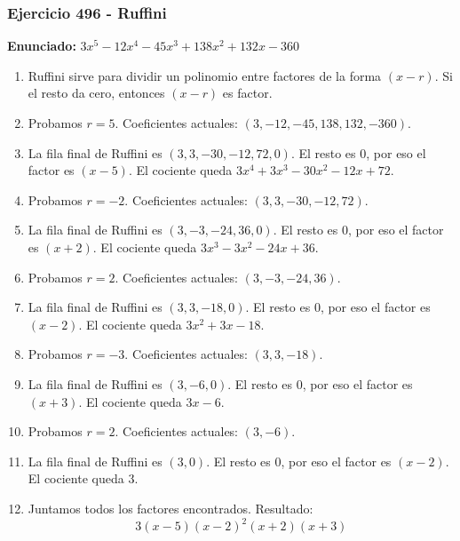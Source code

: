 \documentclass[11pt,a4paper]{article}
\begin{document}
\subsubsection*{Ejercicio 496 - Ruffini}
\textbf{Enunciado:} $ 3 x^{5} - 12 x^{4} - 45 x^{3} + 138 x^{2} + 132 x - 360 $\par
\begin{enumerate}[leftmargin=2em]
\item Ruffini sirve para dividir un polinomio entre factores de la forma \((x-r)\). Si el resto da cero, entonces \((x-r)\) es factor.
\item Probamos \(r=5\). Coeficientes actuales: \((3, -12, -45, 138, 132, -360)\).
\item La fila final de Ruffini es \((3, 3, -30, -12, 72, 0)\). El resto es \(0\), por eso el factor es \((x-5)\). El cociente queda \(3 x^{4} + 3 x^{3} - 30 x^{2} - 12 x + 72\).
\item Probamos \(r=-2\). Coeficientes actuales: \((3, 3, -30, -12, 72)\).
\item La fila final de Ruffini es \((3, -3, -24, 36, 0)\). El resto es \(0\), por eso el factor es \((x+2)\). El cociente queda \(3 x^{3} - 3 x^{2} - 24 x + 36\).
\item Probamos \(r=2\). Coeficientes actuales: \((3, -3, -24, 36)\).
\item La fila final de Ruffini es \((3, 3, -18, 0)\). El resto es \(0\), por eso el factor es \((x-2)\). El cociente queda \(3 x^{2} + 3 x - 18\).
\item Probamos \(r=-3\). Coeficientes actuales: \((3, 3, -18)\).
\item La fila final de Ruffini es \((3, -6, 0)\). El resto es \(0\), por eso el factor es \((x+3)\). El cociente queda \(3 x - 6\).
\item Probamos \(r=2\). Coeficientes actuales: \((3, -6)\).
\item La fila final de Ruffini es \((3, 0)\). El resto es \(0\), por eso el factor es \((x-2)\). El cociente queda \(3\).
\item Juntamos todos los factores encontrados. Resultado: \[\boxed{3 \left(x - 5\right) \left(x - 2\right)^{2} \left(x + 2\right) \left(x + 3\right)}\]
\end{enumerate}

\vspace{0.2cm}
\end{document}
